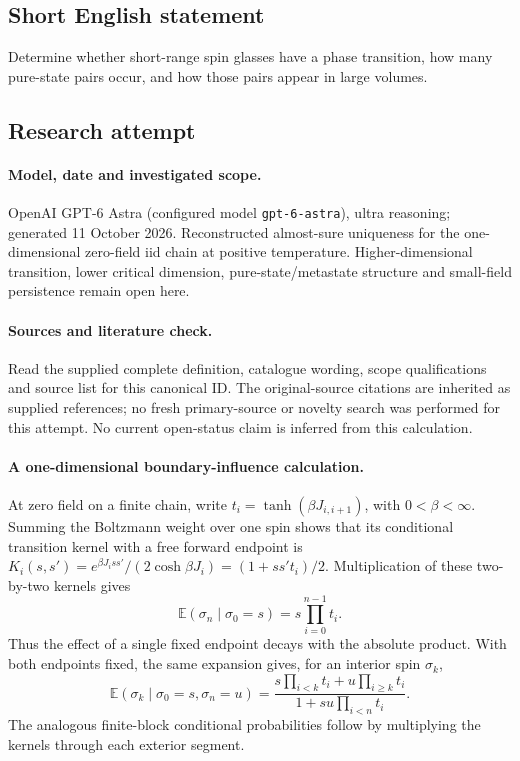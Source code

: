 \documentclass[11pt]{article}
\begin{document}
\subsection{Short English statement}
Determine whether short-range spin glasses have a phase transition, how many pure-state pairs occur, and how those pairs appear in large volumes.
\subsection{Research attempt}
\paragraph{Model, date and investigated scope.}
OpenAI GPT-6 Astra (configured model \texttt{gpt-6-astra}), ultra reasoning; generated 11 October 2026. Reconstructed almost-sure uniqueness for the one-dimensional zero-field iid chain at positive temperature. Higher-dimensional transition, lower critical dimension, pure-state/metastate structure and small-field persistence remain open here.

\paragraph{Sources and literature check.}
Read the supplied complete definition, catalogue wording, scope qualifications and source list for this canonical ID. The original-source citations are inherited as supplied references; no fresh primary-source or novelty search was performed for this attempt. No current open-status claim is inferred from this calculation.

\paragraph{A one-dimensional boundary-influence calculation.}At zero field on a finite chain, write \(t_i=\tanh(\beta J_{i,i+1})\), with \(0<\beta<\infty\). Summing the Boltzmann weight over one spin shows that its conditional transition kernel with a free forward endpoint is \(K_i(s,s')=e^{\beta J_i ss'}/(2\cosh\beta J_i)=(1+ss't_i)/2\). Multiplication of these two-by-two kernels gives
\[\mathbb E(\sigma_n\mid\sigma_0=s)=s\prod_{i=0}^{n-1}t_i.\]
Thus the effect of a single fixed endpoint decays with the absolute product. With both endpoints fixed, the same expansion gives, for an interior spin \(\sigma_k\),
\[\mathbb E(\sigma_k\mid\sigma_0=s,\sigma_n=u)=
\frac{s\prod_{i<k}t_i+u\prod_{i\ge k}t_i}{1+su\prod_{i<n}t_i}.
\]
The analogous finite-block conditional probabilities follow by multiplying the kernels through each exterior segment.
\end{document}
